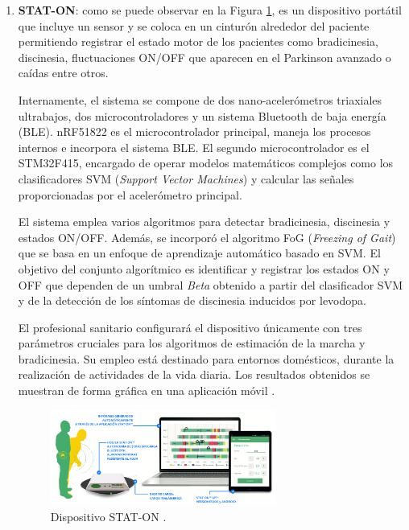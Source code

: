 \begin{enumerate}
    Por otra parte, cuando el paciente presenta discinesia  el espectro de potencia de las frecuencias más bajas aumenta. Se consideró el rango del espectro de potencia de la banda de frecuencias de 1 a 4 Hz para detectar discinesia siempre que las frecuencias más altas (8 a 20 Hz) no presenten un espectro de potencia alto que representan actividades como caminar o subir escaleras \cite{perez2016dopaminergic}.
    
    
    \item \textbf{STAT-ON}: como se puede observar en la Figura \ref{fig:staton}, es un dispositivo portátil que incluye un sensor y se coloca en un cinturón alrededor del paciente permitiendo registrar el estado motor de los pacientes  como bradicinesia, discinesia, fluctuaciones ON/OFF que aparecen en el Parkinson avanzado o caídas entre otros. 

    Internamente, el sistema se compone de dos nano-acelerómetros triaxiales ultrabajos, dos microcontroladores y un sistema Bluetooth de baja energía (BLE). nRF51822 es el microcontrolador principal, maneja los procesos internos e incorpora el sistema BLE. El segundo microcontrolador es el  STM32F415, encargado de operar modelos matemáticos complejos como los clasificadores SVM (\textit{Support Vector Machines}) y calcular las señales proporcionadas por el acelerómetro principal.

    El sistema emplea varios algoritmos para detectar bradicinesia, discinesia y estados ON/OFF. Además, se incorporó el algoritmo FoG (\textit{Freezing of Gait}) que se basa en un enfoque de aprendizaje automático basado en SVM. El objetivo del conjunto algorítmico es identificar y registrar los estados ON y OFF que dependen de un umbral \textit{Beta} obtenido a partir del clasificador SVM y de la detección de los síntomas de discinesia inducidos por levodopa.  
    
    El profesional sanitario configurará el dispositivo únicamente con tres parámetros cruciales para los algoritmos de estimación de la marcha y bradicinesia. Su empleo está destinado  para entornos domésticos,  durante la realización de actividades de la vida diaria. Los resultados obtenidos se muestran de forma gráfica en una aplicación móvil
    \cite{rodriguez2022new}.

    \begin{figure}[ht]
        \centering
        \includegraphics[width=0.7\textwidth]{img/staton-holter.png}
        \caption{Dispositivo STAT-ON \cite{rodriguez2022new}.}
        \label{fig:staton}
    \end{figure}
\end{enumerate}

